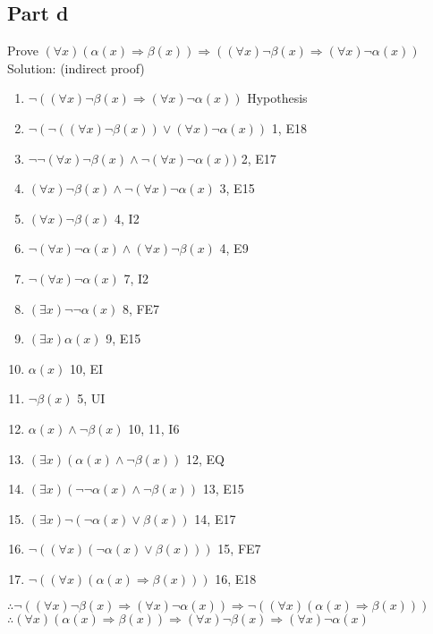 \documentclass{article}
\begin{document}
		\subsection{Part d}
			Prove $(\forall x)(\alpha(x) \Rightarrow \beta(x)) \Rightarrow ((\forall x)\lnot\beta(x) \Rightarrow (\forall x)\lnot\alpha(x))$ \\
			Solution: (indirect proof) \\
			\begin{enumerate}
				\item $\lnot((\forall x)\lnot\beta(x) \Rightarrow (\forall x)\lnot\alpha(x))$ \hfill Hypothesis
				\item $\lnot(\lnot((\forall x)\lnot\beta(x)) \lor (\forall x)\lnot\alpha(x))$ \hfill 1, E18
				\item $\lnot\lnot(\forall x)\lnot\beta(x) \land \lnot(\forall x)\lnot\alpha(x))$ \hfill 2, E17
				\item $(\forall x)\lnot\beta(x) \land \lnot(\forall x)\lnot\alpha(x)$ \hfill 3, E15
				\item $(\forall x)\lnot\beta(x)$ \hfill 4, I2
				\item $\lnot(\forall x)\lnot\alpha(x) \land (\forall x)\lnot\beta(x)$ \hfill 4, E9
				\item $\lnot(\forall x)\lnot\alpha(x)$ \hfill 7, I2
				\item $(\exists x)\lnot\lnot\alpha(x)$ \hfill 8, FE7
				\item $(\exists x)\alpha(x)$ \hfill 9, E15
				\item $\alpha(x)$ \hfill 10, EI
				\item $\lnot\beta(x)$ \hfill 5, UI 
				\item $\alpha(x) \land \lnot\beta(x)$ \hfill 10, 11, I6
				\item $(\exists x)(\alpha(x) \land \lnot\beta(x))$ \hfill 12, EQ
				\item $(\exists x)(\lnot\lnot\alpha(x) \land \lnot\beta(x))$ \hfill 13, E15 
				\item $(\exists x)\lnot(\lnot\alpha(x) \lor \beta(x))$ \hfill 14, E17
				\item $\lnot((\forall x)(\lnot\alpha(x) \lor \beta(x)))$ \hfill 15, FE7
				\item $\lnot((\forall x)(\alpha(x) \Rightarrow \beta(x)))$ \hfill 16, E18
			\end{enumerate}
			$\therefore \lnot((\forall x)\lnot\beta(x) \Rightarrow (\forall x)\lnot\alpha(x)) \Rightarrow \lnot((\forall x)(\alpha(x) \Rightarrow \beta(x)))$ \\
			$\therefore (\forall x)(\alpha(x) \Rightarrow \beta(x)) \Rightarrow (\forall x)\lnot\beta(x) \Rightarrow (\forall x)\lnot\alpha(x)$ \\
\end{document}
